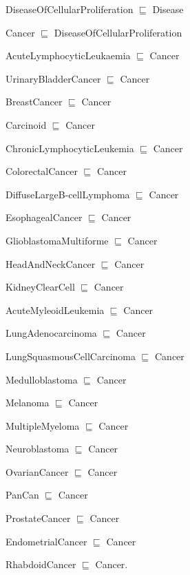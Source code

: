 \vspace{-2mm}
\begin{itemize}[noitemsep]
\scriptsize{
  \item DiseaseOfCellularProliferation  $\sqsubseteq $ Disease
  \item Cancer $\sqsubseteq $ DiseaseOfCellularProliferation
  \item AcuteLymphocyticLeukaemia $ \sqsubseteq $ Cancer
  \item UrinaryBladderCancer $ \sqsubseteq $ Cancer
  \item BreastCancer $ \sqsubseteq $ Cancer
  \item Carcinoid $ \sqsubseteq $ Cancer
    \item ChronicLymphocyticLeukemia $ \sqsubseteq $ Cancer
  \item ColorectalCancer $ \sqsubseteq $ Cancer
  \item DiffuseLargeB-cellLymphoma $ \sqsubseteq $ Cancer
  \item EsophagealCancer $ \sqsubseteq $ Cancer
  \item GlioblastomaMultiforme $ \sqsubseteq $ Cancer
  \item HeadAndNeckCancer $ \sqsubseteq $ Cancer
 \item KidneyClearCell $ \sqsubseteq $ Cancer
  \item AcuteMyleoidLeukemia $ \sqsubseteq $ Cancer
    \item LungAdenocarcinoma $ \sqsubseteq $ Cancer
  \item LungSquasmousCellCarcinoma $ \sqsubseteq $ Cancer
  \item Medulloblastoma $ \sqsubseteq $ Cancer
  \item Melanoma $ \sqsubseteq $ Cancer
  \item MultipleMyeloma $ \sqsubseteq $ Cancer
  \item Neuroblastoma $ \sqsubseteq $ Cancer
  \item OvarianCancer $ \sqsubseteq $ Cancer
    \item PanCan $ \sqsubseteq $ Cancer
      \item ProstateCancer $ \sqsubseteq $ Cancer
  \item EndometrialCancer $ \sqsubseteq $ Cancer
  \item RhabdoidCancer $ \sqsubseteq $ Cancer.}
\end{itemize}
\vspace{-4mm}

